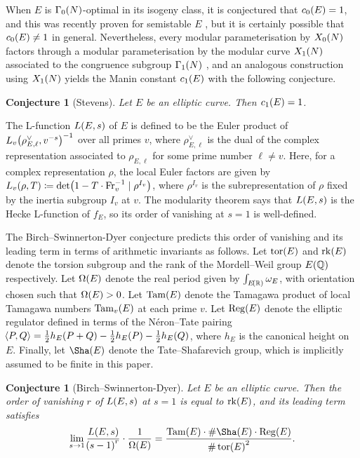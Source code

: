 \documentclass{article}
\theoremstyle{plain}
\newtheorem{conjecture}[n]{Conjecture}
\theoremstyle{definition}
\newcommand{\Fr}{\operatorname{Fr}}
\newcommand{\QQ}{\mathbb{Q}}
\newcommand{\Reg}{\operatorname{Reg}}
\newcommand{\rk}{\operatorname{rk}}
\newcommand{\RR}{\mathbb{R}}
\newcommand{\Tam}{\operatorname{Tam}}
\newcommand{\tor}{\operatorname{tor}}
\newcommand{\abr}[2][-1]{\!\ifthenelse{\equal{#1}{-1}}{\left\langle#2\right\rangle}{}\ifthenelse{\equal{#1}{0}}{\langle#2\rangle}{}\ifthenelse{\equal{#1}{1}}{\bigl\langle#2\bigr\rangle}{}}
\newcommand{\br}{\!\del}
\begin{document}
When $ E $ is $ \Gamma_0\br{N} $-optimal in its isogeny class, it is conjectured that $ c_0\br{E} = 1 $, and this was recently proven for semistable $ E $ \cite[Theorem 1.2]{C18}, but it is certainly possible that $ c_0\br{E} \ne 1 $ in general. Nevertheless, every modular parameterisation by $ X_0\br{N} $ factors through a modular parameterisation by the modular curve $ X_1\br{N} $ associated to the congruence subgroup $ \Gamma_1\br{N} $ \cite[Theorem 1.9]{Ste89}, and an analogous construction using $ X_1\br{N} $ yields the Manin constant $ c_1\br{E} $ with the following conjecture.

\begin{conjecture}[Stevens]
Let $ E $ be an elliptic curve. Then $ c_1\br{E} = 1 $.
\end{conjecture}

The L-function $ L\br{E, s} $ of $ E $ is defined to be the Euler product of $ L_v\br[1]{\rho_{E, \ell}^\vee, v^{-s}}^{-1} $ over all primes $ v $, where $ \rho_{E, \ell}^\vee $ is the dual of the complex representation associated to $ \rho_{E, \ell} $ for some prime number $ \ell \ne v $. Here, for a complex representation $ \rho $, the local Euler factors are given by $ L_v\br{\rho, T} \coloneqq \det\br[1]{1 - T \cdot \Fr_v^{-1} \mid \rho^{I_v}} $, where $ \rho^{I_v} $ is the subrepresentation of $ \rho $ fixed by the inertia subgroup $ I_v $ at $ v $. The modularity theorem says that $ L\br{E, s} $ is the Hecke L-function of $ f_E $, so its order of vanishing at $ s = 1 $ is well-defined.

The Birch--Swinnerton-Dyer conjecture predicts this order of vanishing and its leading term in terms of arithmetic invariants as follows. Let $ \tor\br{E} $ and $ \rk\br{E} $ denote the torsion subgroup and the rank of the Mordell--Weil group $ E\br{\QQ} $ respectively. Let $ \Omega\br{E} $ denote the real period given by $ \int_{E\br{\RR}} \omega_E $, with orientation chosen such that $ \Omega\br{E} > 0 $. Let $ \Tam\br{E} $ denote the Tamagawa product of local Tamagawa numbers $ \Tam_v\br{E} $ at each prime $ v $. Let $ \Reg\br{E} $ denote the elliptic regulator defined in terms of the N\'eron--Tate pairing $ \abr{P, Q} = \tfrac{1}{2}h_E\br{P + Q} - \tfrac{1}{2}h_E\br{P} - \tfrac{1}{2}h_E\br{Q} $, where $ h_E $ is the canonical height on $ E $. Finally, let $ \Sha\br{E} $ denote the Tate--Shafarevich group, which is implicitly assumed to be finite in this paper.

\begin{conjecture}[Birch--Swinnerton-Dyer]
Let $ E $ be an elliptic curve. Then the order of vanishing $ r $ of $ L\br{E, s} $ at $ s = 1 $ is equal to $ \rk\br{E} $, and its leading term satisfies
$$ \lim_{s \to 1} \dfrac{L\br{E, s}}{\br{s - 1}^r} \cdot \dfrac{1}{\Omega\br{E}} = \dfrac{\Tam\br{E} \cdot \#\Sha\br{E} \cdot \Reg\br{E}}{\#\tor\br{E}^2}. $$
\end{conjecture}
\end{document}
